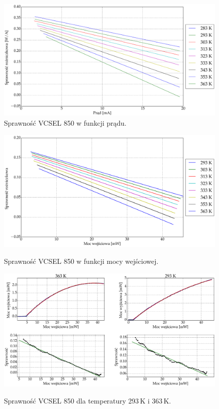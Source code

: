 \begin{figure}
\center
  \includegraphics[scale=0.30]{plot_vcsel_850/plot_eff_all_via_current.eps}
  \caption{Sprawność VCSEL 850 w funkcji prądu.}
  \label{fig:rys2}
\end{figure}
\begin{figure}
\center
  \includegraphics[scale=0.30]{plot_vcsel_850/plot_eff_all_via_power.eps}
  \label{fig:rys3}
  \caption{Sprawność VCSEL 850 w funkcji mocy wejściowej.}
\end{figure}
\begin{figure}
\center
  \includegraphics[scale=0.30]{plot_vcsel_850/plot_eff_20_90_via_power.eps}
  \label{fig:rys4}
  \caption{Sprawność VCSEL 850 dla temperatury 293\,K i 363\,K.} 
\end{figure}
